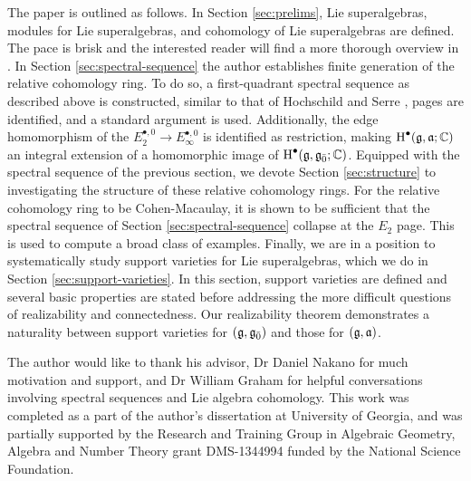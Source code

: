The paper is outlined as follows. In Section \ref{sec:prelims}, Lie superalgebras, modules for Lie superalgebras, and cohomology of Lie superalgebras are defined. The pace is brisk and the interested reader will find a more thorough overview in \cite{BKN-1,Kac}. In Section \ref{sec:spectral-sequence} the author establishes finite generation of the relative cohomology ring. To do so, a first-quadrant spectral sequence as described above is constructed, similar to that of Hochschild and Serre \cite{HS-53}, pages are identified, and a standard argument is used. Additionally, the edge homomorphism of the $E_2^{\bullet,0} \to E_\infty^{\bullet,0}$ is identified as restriction, making $\operatorname{H}^\bullet(\mathfrak{g},\mathfrak{a};\mathbb{C})$ an integral extension of a homomorphic image of $\operatorname{H}^\bullet(\mathfrak{g},{\mathfrak{g}}_{\bar{0}};\mathbb{C})$. Equipped with the spectral sequence of the previous section, we devote Section \ref{sec:structure} to investigating the structure of these relative cohomology rings. For the relative cohomology ring to be Cohen-Macaulay, it is shown to be sufficient that the spectral sequence of Section \ref{sec:spectral-sequence} collapse at the $E_2$ page. This is used to compute a broad class of examples. Finally, we are in a position to systematically study support varieties for Lie superalgebras, which we do in Section \ref{sec:support-varieties}. In this section, support varieties are defined and several basic properties are stated before addressing the more difficult questions of realizability and connectedness. Our realizability theorem demonstrates a naturality between support varieties for $(\mathfrak{g},{\mathfrak{g}}_{\bar{0}})$ and those for $(\mathfrak{g},\mathfrak{a})$.

The author would like to thank his advisor, Dr Daniel Nakano for much motivation and support, and Dr William Graham for helpful conversations involving spectral sequences and Lie algebra cohomology. This work was completed as a part of the author's dissertation at University of Georgia, and was partially supported by the Research and Training Group in Algebraic Geometry, Algebra and Number Theory grant DMS-1344994 funded by the National Science Foundation.

